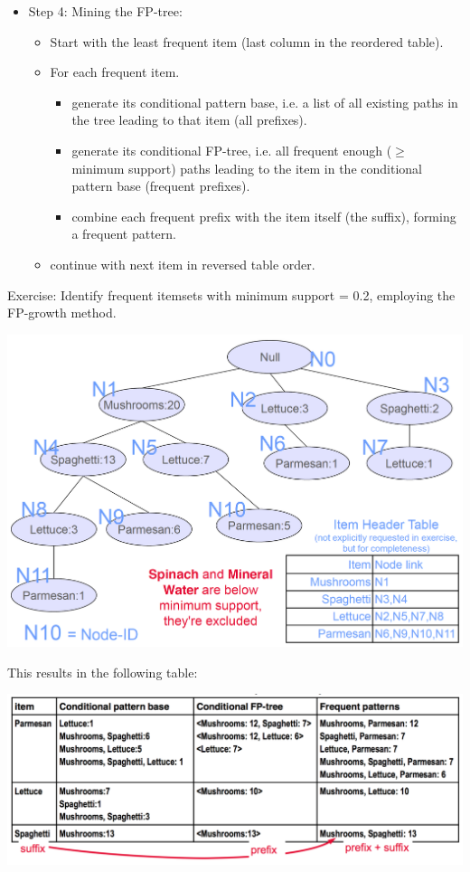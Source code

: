 \begin{breakbox}
\begin{itemize}
	\item Step 4: Mining the FP-tree:
		\begin{itemize}
			\item Start with the least frequent item (last column in the reordered table).
			\item For each frequent item.
				\begin{itemize}
					\item generate its conditional pattern base, i.e. a list of all existing paths in the tree leading to that item (all prefixes).
					\item generate its conditional FP-tree, i.e. all frequent enough ($\geq$ minimum support) paths leading to the item in the conditional pattern base (frequent prefixes).
					\item combine each frequent prefix with the item itself (the suffix), forming a frequent pattern.
				\end{itemize}
			\item continue with next item in reversed table order.
		\end{itemize}
\end{itemize}
Exercise: Identify frequent itemsets with minimum support = 0.2, employing the FP-growth method.
\begin{center}
\includegraphics[width=.15\textwidth]{slides_images/fp_tree}
\end{center}
This results in the following table:
\begin{center}
\includegraphics[width=.15\textwidth]{slides_images/frequent_patterns}
\end{center}
\end{breakbox}

